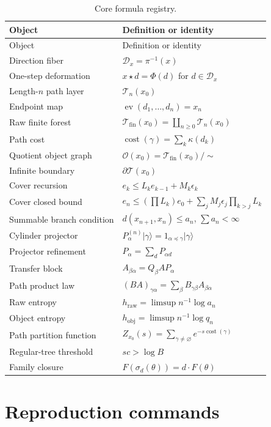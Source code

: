 \documentclass[11pt,openany]{report}
\theoremstyle{definition}
\theoremstyle{remark}
\newcommand{\Tcal}{\mathcal T}
\newcommand{\Dcal}{\mathcal D}
\newcommand{\Ocal}{\mathcal O}
\newcommand{\cost}{\operatorname{cost}}
\newcommand{\ev}{\operatorname{ev}}
\begin{document}
\begin{longtable}{L{0.31\textwidth}L{0.58\textwidth}}
\caption{Core formula registry.}\label{tab:formula-registry}\\
\toprule
Object & Definition or identity \\
\midrule
\endfirsthead
\toprule
Object & Definition or identity \\
\midrule
\endhead
Direction fiber & $\Dcal_x=\pi^{-1}(x)$ \\
One-step deformation & $x\star d=\Phi(d)$ for $d\in\Dcal_x$ \\
Length-$n$ path layer & $\Tcal_n(x_0)$ \\
Endpoint map & $\ev(d_1,\ldots,d_n)=x_n$ \\
Raw finite forest & $\Tcal_{\mathrm{fin}}(x_0)=\coprod_{n\ge0}\Tcal_n(x_0)$ \\
Path cost & $\cost(\gamma)=\sum_k\kappa(d_k)$ \\
Quotient object graph & $\Ocal(x_0)=\Tcal_{\mathrm{fin}}(x_0)/\sim$ \\
Infinite boundary & $\partial\Tcal(x_0)$ \\
Cover recursion & $e_k\le L_ke_{k-1}+M_k\epsilon_k$ \\
Cover closed bound & $e_n\le (\prod L_k)e_0+\sum_jM_j\epsilon_j\prod_{k>j}L_k$ \\
Summable branch condition & $d(x_{n+1},x_n)\le a_n$, $\sum a_n<\infty$ \\
Cylinder projector & $P^{(n)}_\alpha\lvert\gamma\rangle=1_{\alpha\preceq\gamma}\lvert\gamma\rangle$ \\
Projector refinement & $P_\alpha=\sum_dP_{\alpha d}$ \\
Transfer block & $A_{\beta\alpha}=Q_\beta A P_\alpha$ \\
Path product law & $(BA)_{\gamma\alpha}=\sum_\beta B_{\gamma\beta}A_{\beta\alpha}$ \\
Raw entropy & $h_{\mathrm{raw}}=\limsup n^{-1}\log a_n$ \\
Object entropy & $h_{\mathrm{obj}}=\limsup n^{-1}\log q_n$ \\
Path partition function & $Z_{x_0}(s)=\sum_{\gamma\ne\varnothing}e^{-s\cost(\gamma)}$ \\
Regular-tree threshold & $sc>\log B$ \\
Family closure & $F(\sigma_d(\theta))=d\cdot F(\theta)$ \\
\bottomrule
\end{longtable}

\chapter{Reproduction commands}
\end{document}
